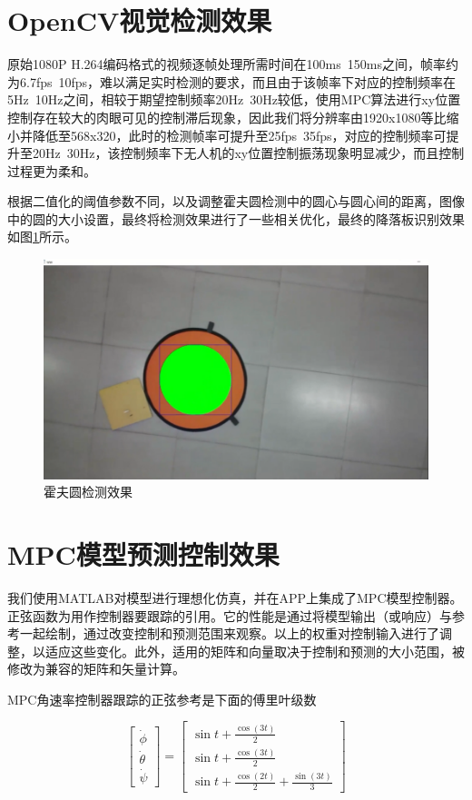 \section{OpenCV视觉检测效果}

原始1080P H.264编码格式的视频逐帧处理所需时间在100ms~150ms之间，帧率约为6.7fps~10fps，难以满足实时检测的要求，而且由于该帧率下对应的控制频率在5Hz~10Hz之间，相较于期望控制频率20Hz~30Hz较低，使用MPC算法进行xy位置控制存在较大的肉眼可见的控制滞后现象，因此我们将分辨率由1920x1080等比缩小并降低至568x320，此时的检测帧率可提升至25fps~35fps，对应的控制频率可提升至20Hz~30Hz，该控制频率下无人机的xy位置控制振荡现象明显减少，而且控制过程更为柔和。

根据二值化的阈值参数不同，以及调整霍夫圆检测中的圆心与圆心间的距离，图像中的圆的大小设置，最终将检测效果进行了一些相关优化，最终的降落板识别效果如图\ref{Fig:img16}所示。

\begin{figure}[ht]
  \centering
  \includegraphics[width=0.8\linewidth]{./Figure/Hough_Circle_Detection.png}
  \caption{霍夫圆检测效果}\label{Fig:img16}
\end{figure}

\section{MPC模型预测控制效果}

我们使用MATLAB对模型进行理想化仿真，并在APP上集成了MPC模型控制器。正弦函数为用作控制器要跟踪的引用。它的性能是通过将模型输出（或响应）与参考一起绘制，通过改变控制和预测范围来观察。以上的权重对控制输入进行了调整，以适应这些变化。此外，适用的矩阵和向量取决于控制和预测的大小范围，被修改为兼容的矩阵和矢量计算。

MPC角速率控制器跟踪的正弦参考是下面的傅里叶级数

$$
\left[\begin{array}{c}
\dot{\phi} \\
\dot{\theta} \\
\dot{\psi}
\end{array}\right]=\left[\begin{array}{c}
\sin t+\frac{\cos (3 t)}{2} \\
\sin t+\frac{\cos (3 t)}{2} \\
\sin t+\frac{\cos (2 t)}{2}+\frac{\sin (3 t)}{3}
\end{array}\right]
$$

